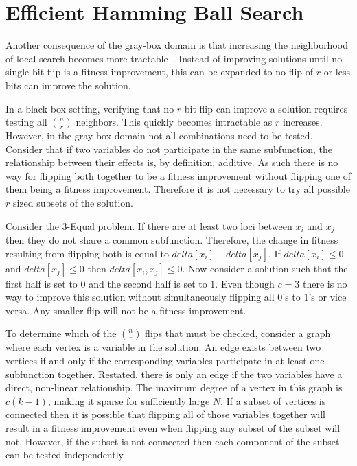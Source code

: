 \section{Efficient Hamming Ball Search}
\label{sec-hamming}
Another consequence of the gray-box domain is that increasing the neighborhood of local search becomes
more tractable~\cite{chicano:2014:ball}.  Instead of improving solutions until no single bit flip
is a fitness improvement, this can be expanded to no flip of $r$ or less bits can improve the solution.

In a black-box setting, verifying that no $r$ bit flip can improve a solution requires testing all
$n \choose r$ neighbors. This quickly becomes intractable as $r$
increases. However, %
in the gray-box
domain not all combinations need to be tested. Consider that if two variables do not participate
in the same subfunction, the relationship between their effects is, %
by definition,  %
additive. As such
there is no way for flipping both together to be a fitness improvement without flipping one of them
being a fitness improvement. Therefore it is not necessary to try all possible $r$ sized subsets
of the solution.

Consider the 3-Equal problem.  If there are at least two loci between
$x_i$ and $x_j$ 
then 
they do
not share a common subfunction. Therefore, the change in fitness resulting from flipping
both is equal to $delta[x_i] + delta[x_j]$. 
If $delta[x_i] \leq 0$ and $delta[x_j] \leq 0$
then $delta[x_i,x_j] \leq 0$. Now consider a solution such that the first half is set to 0
and the second half is set to 1. Even though $c=3$ there is no way to improve this solution without
simultaneously flipping all 0's to 1's or vice versa. Any smaller flip will not
be a fitness improvement.

To determine which of the $n \choose r$ flips that must be checked, consider a graph where
each vertex is a variable in the solution. An edge exists between two vertices if and only
if the corresponding variables participate in at least one subfunction together. Restated,
there is only an edge if the two variables have a direct, %
non-linear relationship. The maximum
degree of a vertex in this graph is $c(k-1)$, making it sparse for sufficiently large $N$.
If a subset of vertices is connected then it is possible that flipping all of those
variables together will result in a fitness improvement even when flipping any subset
of the subset will not. However, if the subset is not connected then each component
of the subset can be tested independently.

